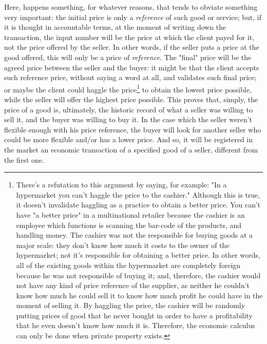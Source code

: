 \documentclass[12pt,a4paper,twoside]{book}
\begin{document}
Here, happens something, for whatever reasons, that tends to obviate something very important: the initial price is only a \textit{reference} of such good or service; but, if it is thought in accountable terms, at the moment of writing down the transaction, the input number will be the price at which the client payed for it, not the price offered by the seller. In other words, if the seller puts a price at the good offered, this will only be a price of \textit{reference}. The "final" price will be the agreed price between the seller and the buyer: it might be that the client accepts such reference price, without saying a word at all, and validates such final price; or maybe the client could haggle the price\footnote{There's a refutation to this argument by saying, for example: "In a hypermarket you can't haggle the price to the cashier." Although this is true, it doesn't invalidate haggling as a practice to obtain a better price. You can't have "a better price" in a multinational retailer because the cashier is an employee which functions is scanning the bar-code of the products, and handling money. The cashier was not the responsible for buying goods at a major scale: they don't know how much it costs to the owner of the hypermarket; not it's responsible for obtaining a better price. In other words, all of the existing goods within the hypermarket are completely foreign because he was not responsible of buying it; and, therefore, the cashier would not have any kind of price reference of the supplier, as neither he couldn't know how much he could sell it to know how much profit he could have in the moment of selling it. By haggling the price, the cashier will be randomly putting prices of good that he never bought in order to have a profitability that he even doesn't know how much it is. Therefore, the economic calculus can only be done when private property exists.} to obtain the lowest price possible, while the seller will offer the highest price possible. This proves that, simply, the price of a good is, ultimately, the historic record of what a seller was willing to sell it, and the buyer was willing to buy it. In the case which the seller weren't flexible enough with his price reference, the buyer will look for another seller who could be more flexible and/or has a lower price. And so, it will be registered in the market an economic transaction of a specified good of a seller, different from the first one.
\end{document}
